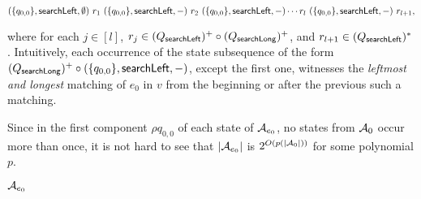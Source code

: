 \medskip
{\small
$
(\{q_{0,0}\}, \mathsf{searchLeft}, \emptyset)\ r_1\ ( \{q_{0,0}\}, \mathsf{searchLeft}, -) \ r_2\ ( \{q_{0,0}\}, \mathsf{searchLeft}, -)
\cdots r_l\ ( \{q_{0,0}\}, \mathsf{searchLeft}, -)\ r_{l+1},
$
}
\medskip

where for each $j \in [l]$, $r_j \in (Q_{\mathsf{searchLeft}})^+ \circ (Q_{\mathsf{searchLong}})^+$, and $r_{l+1} \in (Q_{\mathsf{searchLeft}})^*$. Intuitively, each occurrence of the state subsequence of the form $(Q_{\mathsf{searchLong}})^+ \circ (\{q_{0,0}\}, \mathsf{searchLeft},-)$, except the first one, witnesses the \emph{leftmost and longest} matching of $e_0$ in $v$ from the beginning or after the previous such a matching.

Since in the first component $\rho q_{0,0}$ of each state of $\mathcal{A}_{e_0}$, no states from $\mathcal{A}_0$ occur more than once,  it is not hard to see that $|\mathcal{A}_{e_0}|$ is $2^{O(p(|\mathcal{A}_0|))}$ for some polynomial $p$. 


\begin{example}
$\mathcal{A}_{e_0}$
\end{example}


